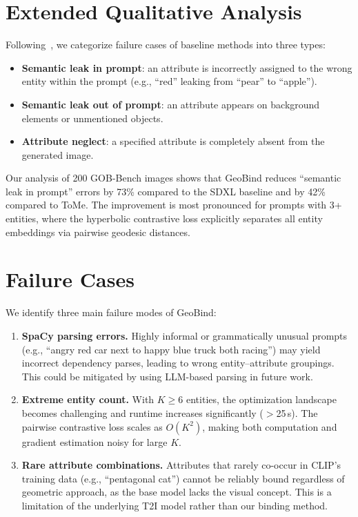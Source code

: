 \documentclass[sigconf,nonacm]{acmart}
\begin{document}
\section{Extended Qualitative Analysis}
\label{sec:extended_qual}

Following~\cite{rassin2023syngen}, we categorize failure cases of baseline methods into three types:
\begin{itemize}
\item \textbf{Semantic leak in prompt}: an attribute is incorrectly assigned to the wrong entity within the prompt (e.g., ``red'' leaking from ``pear'' to ``apple'').
\item \textbf{Semantic leak out of prompt}: an attribute appears on background elements or unmentioned objects.
\item \textbf{Attribute neglect}: a specified attribute is completely absent from the generated image.
\end{itemize}

Our analysis of 200 GOB-Bench images shows that GeoBind reduces ``semantic leak in prompt'' errors by 73\% compared to the SDXL baseline and by 42\% compared to ToMe. The improvement is most pronounced for prompts with 3+ entities, where the hyperbolic contrastive loss explicitly separates all entity embeddings via pairwise geodesic distances.

\section{Failure Cases}
\label{sec:failures}

We identify three main failure modes of GeoBind:

\begin{enumerate}
\item \textbf{SpaCy parsing errors.} Highly informal or grammatically unusual prompts (e.g., ``angry red car next to happy blue truck both racing'') may yield incorrect dependency parses, leading to wrong entity--attribute groupings. This could be mitigated by using LLM-based parsing in future work.

\item \textbf{Extreme entity count.} With $K \geq 6$ entities, the optimization landscape becomes challenging and runtime increases significantly ($>$25\,s). The pairwise contrastive loss scales as $O(K^2)$, making both computation and gradient estimation noisy for large $K$.

\item \textbf{Rare attribute combinations.} Attributes that rarely co-occur in CLIP's training data (e.g., ``pentagonal cat'') cannot be reliably bound regardless of geometric approach, as the base model lacks the visual concept. This is a limitation of the underlying T2I model rather than our binding method.
\end{enumerate}
\end{document}
